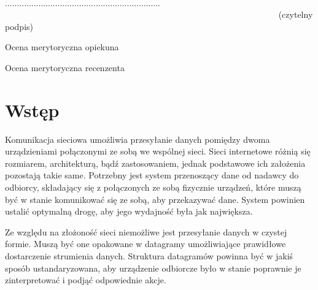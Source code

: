 \documentclass[a4paper, 11pt, twoside, openright]{article}
\begin{document}
\begin{center}

~~~~~~~~~~~~~~~~~~~~~~~~~~~~~~~~~~~~~~~~~~~~~~~~~~~~~~~~~~~~~~~~~ 
................................................................. \\
~~~~~~~~~~~~~~~~~~~~~~~~~~~~~~~~~~~~~~~~~~~~~~~~~~~~~~~~~~~~~~~  {\sf (czytelny podpis)} \\

\end{center}



\newpage
\linespread{1.3}
\selectfont

\hspace*{\fill}\large{Ocena merytoryczna opiekuna}

\vspace{85mm}

\newpage
\linespread{1.3}
\selectfont

\hspace*{\fill}\large{Ocena merytoryczna recenzenta}

\vspace{85mm}


\newpage
\tableofcontents


\cleardoublepage
\section{Wstęp}

\indent\par
Komunikacja sieciowa umożliwia przesyłanie danych pomiędzy dwoma urządzieniami połączonymi ze sobą we wspólnej sieci. Sieci internetowe różnią się
rozmiarem, architekturą, bądź zastosowaniem, jednak podstawowe ich założenia pozostają takie same. Potrzebny jest system przenoszący dane od nadawcy
do odbiorcy, składający się z połączonych ze sobą fizycznie urządzeń, które muszą być w stanie komunikować się ze sobą, aby przekazywać dane. System powinien ustalić
optymalną drogę, aby jego wydajność była jak największa.

Ze względu na złożoność sieci niemożliwe jest przesyłanie danych w czystej formie. Muszą być one opakowane w datagramy umożliwiające prawidłowe dostarczenie strumienia
danych. Struktura datagramów powinna być w jakiś sposób ustandaryzowana, aby urządzenie odbiorcze było w stanie poprawnie je zinterpretować i podjąć odpowiednie akcje.
\end{document}
